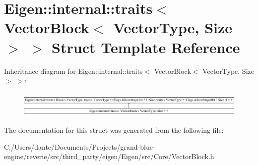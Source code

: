 \hypertarget{struct_eigen_1_1internal_1_1traits_3_01_vector_block_3_01_vector_type_00_01_size_01_4_01_4}{}\section{Eigen\+::internal\+::traits$<$ Vector\+Block$<$ Vector\+Type, Size $>$ $>$ Struct Template Reference}
\label{struct_eigen_1_1internal_1_1traits_3_01_vector_block_3_01_vector_type_00_01_size_01_4_01_4}
Inheritance diagram for Eigen\+::internal\+::traits$<$ Vector\+Block$<$ Vector\+Type, Size $>$ $>$\+:\begin{figure}[H]
\begin{center}
\leavevmode
\includegraphics[height=1.264108cm]{struct_eigen_1_1internal_1_1traits_3_01_vector_block_3_01_vector_type_00_01_size_01_4_01_4}
\end{center}
\end{figure}


The documentation for this struct was generated from the following file\+:\begin{DoxyCompactItemize}
\item 
C\+:/\+Users/dante/\+Documents/\+Projects/grand-\/blue-\/engine/reverie/src/third\+\_\+party/eigen/\+Eigen/src/\+Core/Vector\+Block.\+h\end{DoxyCompactItemize}
